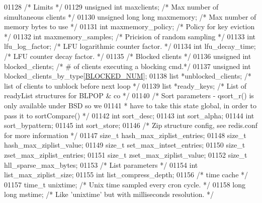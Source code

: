 \begin{DoxyCode}
{{{{{{{01128     \textcolor{comment}{/* Limits */}
01129     \textcolor{keywordtype}{unsigned} \textcolor{keywordtype}{int} maxclients;            \textcolor{comment}{/* Max number of simultaneous clients */}
01130     \textcolor{keywordtype}{unsigned} \textcolor{keywordtype}{long} \textcolor{keywordtype}{long} maxmemory;   \textcolor{comment}{/* Max number of memory bytes to use */}
01131     \textcolor{keywordtype}{int} maxmemory\_policy;           \textcolor{comment}{/* Policy for key eviction */}
01132     \textcolor{keywordtype}{int} maxmemory\_samples;          \textcolor{comment}{/* Pricision of random sampling */}
01133     \textcolor{keywordtype}{int} lfu\_log\_factor;             \textcolor{comment}{/* LFU logarithmic counter factor. */}
01134     \textcolor{keywordtype}{int} lfu\_decay\_time;             \textcolor{comment}{/* LFU counter decay factor. */}
01135     \textcolor{comment}{/* Blocked clients */}
01136     \textcolor{keywordtype}{unsigned} \textcolor{keywordtype}{int} blocked\_clients;   \textcolor{comment}{/* # of clients executing a blocking cmd.*/}
01137     \textcolor{keywordtype}{unsigned} \textcolor{keywordtype}{int} blocked\_clients\_by\_type[\hyperlink{server_8h_a7b2645977d2cac8f57f1b8b51048a3ef}{BLOCKED\_NUM}];
01138     list *unblocked\_clients; \textcolor{comment}{/* list of clients to unblock before next loop */}
01139     list *ready\_keys;        \textcolor{comment}{/* List of readyList structures for BLPOP & co */}
01140     \textcolor{comment}{/* Sort parameters - qsort\_r() is only available under BSD so we}
01141 \textcolor{comment}{     * have to take this state global, in order to pass it to sortCompare() */}
01142     \textcolor{keywordtype}{int} sort\_desc;
01143     \textcolor{keywordtype}{int} sort\_alpha;
01144     \textcolor{keywordtype}{int} sort\_bypattern;
01145     \textcolor{keywordtype}{int} sort\_store;
01146     \textcolor{comment}{/* Zip structure config, see redis.conf for more information  */}
01147     size\_t hash\_max\_ziplist\_entries;
01148     size\_t hash\_max\_ziplist\_value;
01149     size\_t set\_max\_intset\_entries;
01150     size\_t zset\_max\_ziplist\_entries;
01151     size\_t zset\_max\_ziplist\_value;
01152     size\_t hll\_sparse\_max\_bytes;
01153     \textcolor{comment}{/* List parameters */}
01154     \textcolor{keywordtype}{int} list\_max\_ziplist\_size;
01155     \textcolor{keywordtype}{int} list\_compress\_depth;
01156     \textcolor{comment}{/* time cache */}
01157     time\_t unixtime;    \textcolor{comment}{/* Unix time sampled every cron cycle. */}
01158     \textcolor{keywordtype}{long} \textcolor{keywordtype}{long} mstime;   \textcolor{comment}{/* Like 'unixtime' but with milliseconds resolution. */}
}}}}}}}
\end{DoxyCode}

